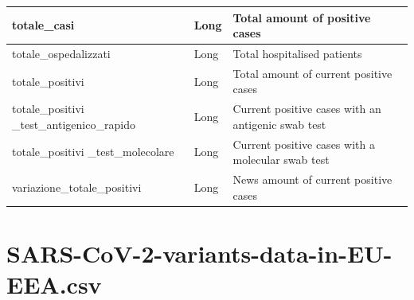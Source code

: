 \documentclass[a4paper,12pt]{article}
\begin{document}
\newpage
\begin{center}
\begin{tabular}{|m{45mm}|>{\raggedright}m{16mm}|m{75mm}|}
\hline
totale\_casi & Long & Total amount of positive cases \\
\hline
totale\_ospedalizzati & Long & Total hospitalised patients \\
\hline
totale\_positivi & Long & Total amount of current positive cases \\
\hline
totale\_positivi  \_test\_antigenico\_rapido & Long & Current positive cases with an antigenic swab test \\
\hline
totale\_positivi  \_test\_molecolare & Long & Current positive cases with a molecular swab test \\
\hline
variazione\_totale\_positivi & Long & News amount of current positive cases \\
\hline
\end{tabular}
\end{center}
\newpage

\section{SARS-CoV-2-variants-data-in-EU-EEA.csv}
\end{document}
